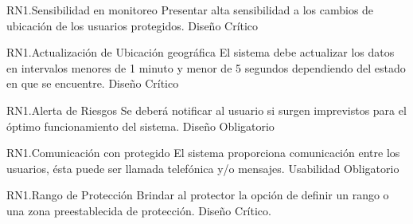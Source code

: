 	
\begin{BussinesRule}{RN1.}{Sensibilidad en monitoreo}
	\BRitem[Descripción:] Presentar alta sensibilidad a los cambios de ubicación de los usuarios protegidos.
	\BRitem[Tipo:] Diseño
	\BRitem[Nivel:] Crítico
\end{BussinesRule}

	
\begin{BussinesRule}{RN1.}{Actualización de Ubicación geográfica}
	\BRitem[Descripción:] El sistema debe actualizar los datos en intervalos menores de 1 minuto y menor de 5 segundos dependiendo del estado en que se encuentre.
	\BRitem[Tipo:] Diseño
	\BRitem[Nivel:] Crítico
\end{BussinesRule}

	
\begin{BussinesRule}{RN1.}{Alerta de Riesgos}
	\BRitem[Descripción:] Se deberá notificar al usuario si surgen imprevistos para el óptimo funcionamiento del sistema.
	\BRitem[Tipo:] Diseño
	\BRitem[Nivel:] Obligatorio
\end{BussinesRule}

	
\begin{BussinesRule}{RN1.}{Comunicación con protegido}
	\BRitem[Descripción:] El sistema proporciona comunicación entre los usuarios, ésta puede ser llamada telefónica y/o mensajes.
	\BRitem[Tipo:] Usabilidad
	\BRitem[Nivel:] Obligatorio
\end{BussinesRule}

	
\begin{BussinesRule}{RN1.}{Rango de Protección}
	\BRitem[Descripción:] Brindar al protector la opción de definir un rango o una zona preestablecida de protección.
	\BRitem[Tipo:] Diseño
	\BRitem[Nivel:] Crítico.
\end{BussinesRule}

